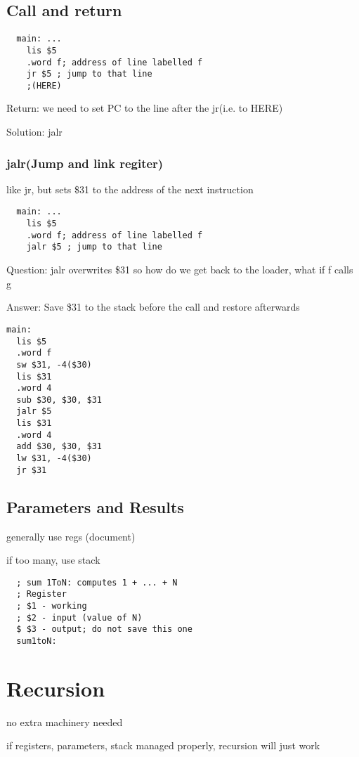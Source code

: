 \documentclass[11pt]{amsart}
\begin{document}
\subsection{Call and return}
\begin{verbatim}
  main: ...
    lis $5
    .word f; address of line labelled f
    jr $5 ; jump to that line
    ;(HERE)
\end{verbatim}
\par Return: we need to set PC to the line after the jr(i.e. to HERE)
\par Solution: jalr
\subsubsection{jalr(Jump and link regiter)}
\par like jr, but sets \$31 to the address of the next instruction
\begin{verbatim}
  main: ...
    lis $5
    .word f; address of line labelled f
    jalr $5 ; jump to that line
\end{verbatim}
\par  Question: jalr overwrites \$31 so how do we get back to the loader, what if f calls
g
\par Answer: Save \$31 to the stack before the call and restore afterwards

\begin{verbatim}
main:
  lis $5
  .word f
  sw $31, -4($30)
  lis $31
  .word 4
  sub $30, $30, $31
  jalr $5
  lis $31
  .word 4
  add $30, $30, $31
  lw $31, -4($30)
  jr $31
\end{verbatim}

\subsection{Parameters and Results}
\par generally use regs (document)
\par if too many, use stack
\begin{verbatim}
  ; sum 1ToN: computes 1 + ... + N
  ; Register
  ; $1 - working
  ; $2 - input (value of N)
  $ $3 - output; do not save this one
  sum1toN:
\end{verbatim}
\section{Recursion}
\par no extra machinery needed
\par if registers, parameters, stack managed properly, recursion will just work
\end{document}
